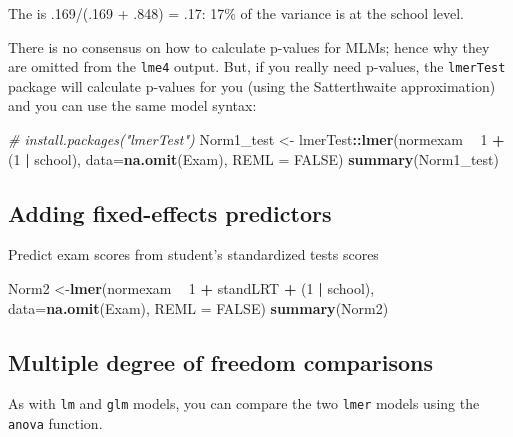 \documentclass[]{book}
\newenvironment{Shaded}{\begin{snugshade}}{\end{snugshade}}
\newcommand{\KeywordTok}[1]{\textcolor[rgb]{0.13,0.29,0.53}{\textbf{#1}}}
\newcommand{\DataTypeTok}[1]{\textcolor[rgb]{0.13,0.29,0.53}{#1}}
\newcommand{\DecValTok}[1]{\textcolor[rgb]{0.00,0.00,0.81}{#1}}
\newcommand{\StringTok}[1]{\textcolor[rgb]{0.31,0.60,0.02}{#1}}
\newcommand{\CommentTok}[1]{\textcolor[rgb]{0.56,0.35,0.01}{\textit{#1}}}
\newcommand{\OtherTok}[1]{\textcolor[rgb]{0.56,0.35,0.01}{#1}}
\newcommand{\OperatorTok}[1]{\textcolor[rgb]{0.81,0.36,0.00}{\textbf{#1}}}
\newcommand{\NormalTok}[1]{#1}
\begin{document}
The is .169/(.169 + .848) = .17: 17\% of the variance is at the school
level.

There is no consensus on how to calculate p-values for MLMs; hence why
they are omitted from the \texttt{lme4} output. But, if you really need
p-values, the \texttt{lmerTest} package will calculate p-values for you
(using the Satterthwaite approximation) and you can use the same model
syntax:

\begin{Shaded}
\begin{Highlighting}[]
  \CommentTok{# install.packages("lmerTest")}
\NormalTok{  Norm1_test <-}\StringTok{ }\NormalTok{lmerTest}\OperatorTok{::}\KeywordTok{lmer}\NormalTok{(normexam }\OperatorTok{~}\StringTok{ }\DecValTok{1} \OperatorTok{+}\StringTok{ }\NormalTok{(}\DecValTok{1} \OperatorTok{|}\StringTok{ }\NormalTok{school),}
                      \DataTypeTok{data=}\KeywordTok{na.omit}\NormalTok{(Exam), }\DataTypeTok{REML =} \OtherTok{FALSE}\NormalTok{)}
  \KeywordTok{summary}\NormalTok{(Norm1_test)}
\end{Highlighting}
\end{Shaded}

\subsection{Adding fixed-effects
predictors}\label{adding-fixed-effects-predictors}

Predict exam scores from student's standardized tests scores

\begin{Shaded}
\begin{Highlighting}[]
\NormalTok{  Norm2 <-}\KeywordTok{lmer}\NormalTok{(normexam }\OperatorTok{~}\StringTok{ }\DecValTok{1} \OperatorTok{+}\StringTok{ }\NormalTok{standLRT }\OperatorTok{+}\StringTok{ }\NormalTok{(}\DecValTok{1} \OperatorTok{|}\StringTok{ }\NormalTok{school),}
               \DataTypeTok{data=}\KeywordTok{na.omit}\NormalTok{(Exam), }\DataTypeTok{REML =} \OtherTok{FALSE}\NormalTok{) }
  \KeywordTok{summary}\NormalTok{(Norm2) }
\end{Highlighting}
\end{Shaded}

\subsection{Multiple degree of freedom
comparisons}\label{multiple-degree-of-freedom-comparisons}

As with \texttt{lm} and \texttt{glm} models, you can compare the two
\texttt{lmer} models using the \texttt{anova} function.
\end{document}
